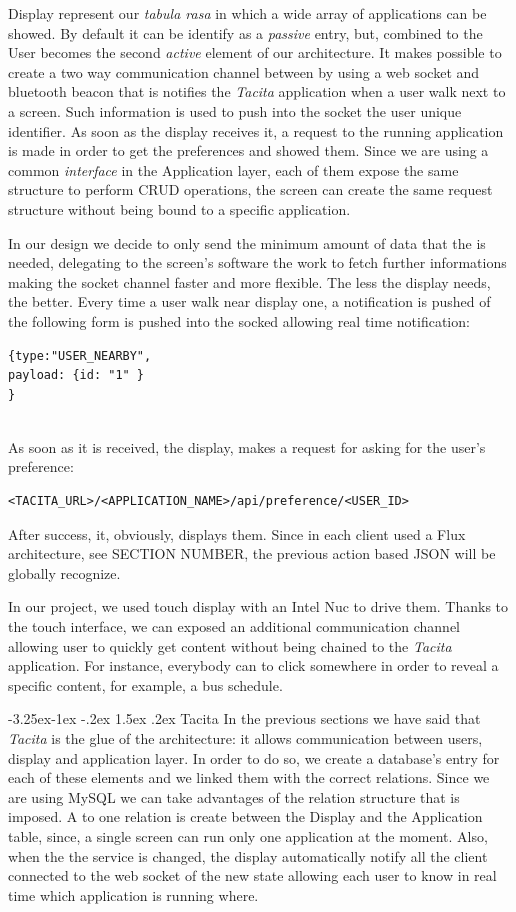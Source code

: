 \documentclass[]{usiinfbachelorproject}
\makeatletter
\newcommand\subsubsection{\@startsection{subsubsection}{3}{\z@}%
                {-3.25ex\@plus -1ex \@minus -.2ex}%
                {1.5ex \@plus .2ex}%
                {\normalfont\normalsize\bfseries}}
\makeatother
\begin{document}
Display represent our \emph{tabula rasa} in which a wide array of applications can be showed. By default it can be identify as a \emph{passive} entry, but, combined to the User becomes the second \emph{active} element of our architecture. It makes possible to create a two way communication channel between by using a web socket and bluetooth beacon that is notifies the \emph{Tacita} application when a user walk next to a screen. Such information is used to push into the socket the user unique identifier. As soon as the display receives it, a request to the running application is made in order to get the preferences and showed them. Since we are using a common \emph{interface} in the Application layer, each of them expose the same structure to perform CRUD operations, the screen can create the same request structure without being bound to a specific application.

In our design we decide to only send the minimum amount of data that the is needed, delegating to the screen's software the work to fetch further informations making the socket channel faster and more flexible. The less the display needs, the better. Every time a user walk near display one, a notification is pushed of the following form is pushed into the socked allowing real time notification:
\begin{lstlisting}
{type:"USER_NEARBY",
payload: {id: "1" }
}
\end{lstlisting}
\\
As soon as it is received, the display, makes a request for asking for the user's preference:
\begin{lstlisting}
<TACITA_URL>/<APPLICATION_NAME>/api/preference/<USER_ID>
\end{lstlisting}
After success, it, obviously, displays them.
Since in each client used a Flux architecture, see SECTION NUMBER, the previous action based JSON will be globally recognize.

In our project, we used touch display with an Intel Nuc to drive them. Thanks to the touch interface, we can exposed an additional communication channel allowing user to quickly get content without being chained to the \emph{Tacita} application. For instance, everybody can to click somewhere in order to reveal a specific content, for example, a bus schedule.
  
\subsubsection{Tacita}
In the previous sections we have said that \emph{Tacita} is the glue of the architecture: it allows communication between users, display and application layer. In order to do so, we create a database's entry for each of these elements and we linked them with the correct relations. Since we are using MySQL we can take advantages of the relation structure that is imposed. A \one to one relation is create between the Display and the Application table, since, a single screen can run only one application at the moment. Also, when the the service is changed, the display automatically notify all the client connected to the web socket of the new state allowing each user to know in real time which application is running where.
\end{document}
